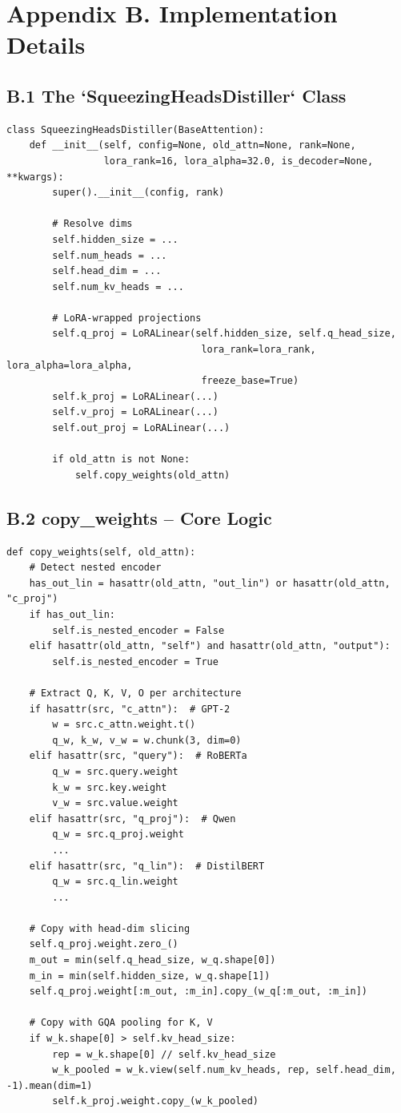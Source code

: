 
\section{Appendix B. Implementation Details}

\subsection{B.1 The `SqueezingHeadsDistiller` Class}

\begin{lstlisting}
class SqueezingHeadsDistiller(BaseAttention):
    def __init__(self, config=None, old_attn=None, rank=None,
                 lora_rank=16, lora_alpha=32.0, is_decoder=None, **kwargs):
        super().__init__(config, rank)
        
        # Resolve dims
        self.hidden_size = ...
        self.num_heads = ...
        self.head_dim = ...
        self.num_kv_heads = ...
        
        # LoRA-wrapped projections
        self.q_proj = LoRALinear(self.hidden_size, self.q_head_size,
                                  lora_rank=lora_rank, lora_alpha=lora_alpha,
                                  freeze_base=True)
        self.k_proj = LoRALinear(...)
        self.v_proj = LoRALinear(...)
        self.out_proj = LoRALinear(...)
        
        if old_attn is not None:
            self.copy_weights(old_attn)
\end{lstlisting}

\subsection{B.2 copy\_weights -- Core Logic}

\begin{lstlisting}
def copy_weights(self, old_attn):
    # Detect nested encoder
    has_out_lin = hasattr(old_attn, "out_lin") or hasattr(old_attn, "c_proj")
    if has_out_lin:
        self.is_nested_encoder = False
    elif hasattr(old_attn, "self") and hasattr(old_attn, "output"):
        self.is_nested_encoder = True
    
    # Extract Q, K, V, O per architecture
    if hasattr(src, "c_attn"):  # GPT-2
        w = src.c_attn.weight.t()
        q_w, k_w, v_w = w.chunk(3, dim=0)
    elif hasattr(src, "query"):  # RoBERTa
        q_w = src.query.weight
        k_w = src.key.weight
        v_w = src.value.weight
    elif hasattr(src, "q_proj"):  # Qwen
        q_w = src.q_proj.weight
        ...
    elif hasattr(src, "q_lin"):  # DistilBERT
        q_w = src.q_lin.weight
        ...
    
    # Copy with head-dim slicing
    self.q_proj.weight.zero_()
    m_out = min(self.q_head_size, w_q.shape[0])
    m_in = min(self.hidden_size, w_q.shape[1])
    self.q_proj.weight[:m_out, :m_in].copy_(w_q[:m_out, :m_in])
    
    # Copy with GQA pooling for K, V
    if w_k.shape[0] > self.kv_head_size:
        rep = w_k.shape[0] // self.kv_head_size
        w_k_pooled = w_k.view(self.num_kv_heads, rep, self.head_dim, -1).mean(dim=1)
        self.k_proj.weight.copy_(w_k_pooled)
\end{lstlisting}

